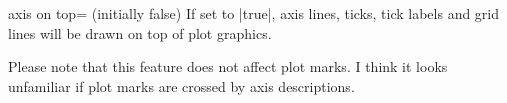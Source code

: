 \begin{pgfplotskey}{axis on top= (initially false)}
	If set to |true|, axis lines, ticks, tick labels and grid lines will be drawn on top of plot graphics.
\begin{codeexample}[]
\end{codeexample}

\begin{codeexample}[]
\end{codeexample}
Please note that this feature does not affect plot marks. I think it looks unfamiliar if plot marks are crossed by axis descriptions.
\end{pgfplotskey}


